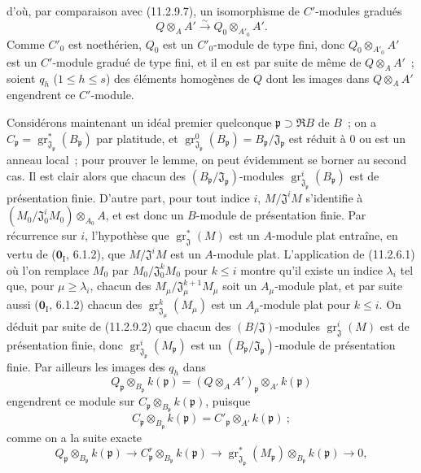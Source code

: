 
d'où, par comparaison avec (11.2.9.7), un isomorphisme de $C'$-modules
gradués
\[
Q\otimes_AA'\xrightarrow{\sim}Q_0\otimes_{A'_0}A'.
\]
Comme $C'_0$ est noethérien, $Q_0$ est un $C'_0$-module de type fini, donc
$Q_0\otimes_{A'_0}A'$ est un $C'$-module gradué de type fini, et il en est par
suite de même de $Q\otimes_AA'$~; soient $q_h$ ($1\leq h\leq s$) des éléments
homogènes de $Q$ dont les images dans $Q\otimes_AA'$ engendrent ce
$C'$-module.

Considérons maintenant un idéal premier quelconque
$\mathfrak p\supset\mathfrak RB$ de $B$~; on a
$C_\mathfrak p=\operatorname{gr}_{\mathfrak J_\mathfrak p}^*(B_\mathfrak p)$
par platitude, et
$\operatorname{gr}_{\mathfrak J_\mathfrak p}^0(B_\mathfrak p)
=B_\mathfrak p/\mathfrak J_\mathfrak p$ est réduit à 0 ou est un anneau
local~; pour prouver le lemme, on peut évidemment se borner au second cas. Il
est clair alors que chacun des $(B_\mathfrak p/\mathfrak J_\mathfrak p)$-modules
$\operatorname{gr}_{\mathfrak J_\mathfrak p}^i(B_\mathfrak p)$ est de
présentation finie. D'autre part, pour tout indice $i$,
$M/\mathfrak J^iM$ s'identifie à
$(M_0/\mathfrak J_0^iM_0)\otimes_{A_0}A$, et est donc un $B$-module de
présentation finie. Par récurrence sur $i$, l'hypothèse que
$\operatorname{gr}_{\mathfrak J}^*(M)$ est un $A$-module plat entraîne, en
vertu de ($\mathbf 0_{\mathrm I}$, 6.1.2), que $M/\mathfrak J^iM$ est un
$A$-module plat. L'application de (11.2.6.1) où l'on remplace $M_0$ par
$M_0/\mathfrak J_0^kM_0$ pour $k\leq i$ montre qu'il existe un indice
$\lambda_i$ tel que, pour $\mu\geq\lambda_i$, chacun des
$M_\mu/\mathfrak J_\mu^{k+1}M_\mu$ soit un $A_\mu$-module plat, et par suite
aussi ($\mathbf 0_{\mathrm I}$, 6.1.2) chacun des
$\operatorname{gr}_{\mathfrak J_\mu}^k(M_\mu)$ est un $A_\mu$-module plat
pour $k\leq i$. On déduit par suite de (11.2.9.2) que chacun des
$(B/\mathfrak J)$-modules $\operatorname{gr}_{\mathfrak J}^i(M)$ est de
présentation finie, donc
$\operatorname{gr}_{\mathfrak J_\mathfrak p}^i(M_\mathfrak p)$ est un
$(B_\mathfrak p/\mathfrak J_\mathfrak p)$-module de présentation finie. Par
ailleurs les images des $q_h$ dans
\[
Q_\mathfrak p\otimes_{B_\mathfrak p}k(\mathfrak p)
=(Q\otimes_AA')_\mathfrak p\otimes_{A'}k(\mathfrak p)
\]
engendrent ce module sur
$C_\mathfrak p\otimes_{B_\mathfrak p}k(\mathfrak p)$, puisque
\[
C_\mathfrak p\otimes_{B_\mathfrak p}k(\mathfrak p)
=C'_\mathfrak p\otimes_{A'}k(\mathfrak p)~;
\]
comme on a la suite exacte
\[
Q_\mathfrak p\otimes_{B_\mathfrak p}k(\mathfrak p)
\longrightarrow C_\mathfrak p^{r}\otimes_{B_\mathfrak p}k(\mathfrak p)
\longrightarrow
\operatorname{gr}_{\mathfrak J_\mathfrak p}^*(M_\mathfrak p)
\otimes_{B_\mathfrak p}k(\mathfrak p)\longrightarrow0,
\]
